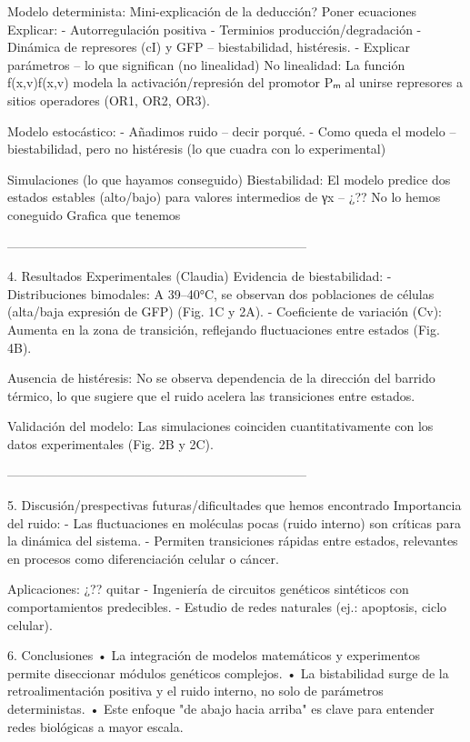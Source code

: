 Modelo determinista:
Mini-explicación de la deducción?
Poner ecuaciones
Explicar:
-	Autorregulación positiva
-	Terminios producción/degradación
-	Dinámica de represores (cI) y GFP – biestabilidad, histéresis.
-	Explicar parámetros – lo que significan (no linealidad)
No linealidad: La función f(x,v)f(x,v) modela la activación/represión del promotor Pₘ al unirse represores a sitios operadores (OR1, OR2, OR3).

Modelo estocástico:
-	Añadimos ruido – decir porqué. 
-	Como queda el modelo – biestabilidad, pero no histéresis (lo que cuadra con lo experimental)

Simulaciones (lo que hayamos conseguido)
Biestabilidad: El modelo predice dos estados estables (alto/bajo) para valores intermedios de γx – ¿?? No lo hemos coneguido
Grafica que tenemos

-----------------------------------------------------------------------

4. Resultados Experimentales (Claudia)
Evidencia de biestabilidad:
- Distribuciones bimodales: A 39–40°C, se observan dos poblaciones de células (alta/baja expresión de GFP) (Fig. 1C y 2A).
- Coeficiente de variación (Cv): Aumenta en la zona de transición, reflejando fluctuaciones entre estados (Fig. 4B).

Ausencia de histéresis:
No se observa dependencia de la dirección del barrido térmico, lo que sugiere que el ruido acelera las transiciones entre estados.

Validación del modelo:
Las simulaciones coinciden cuantitativamente con los datos experimentales (Fig. 2B y 2C).

-----------------------------------------------------------------------

5. Discusión/prespectivas futuras/dificultades que hemos encontrado
Importancia del ruido:
- Las fluctuaciones en moléculas pocas (ruido interno) son críticas para la dinámica del sistema.
- Permiten transiciones rápidas entre estados, relevantes en procesos como diferenciación celular o cáncer.

Aplicaciones: ¿?? quitar
- Ingeniería de circuitos genéticos sintéticos con comportamientos predecibles.
- Estudio de redes naturales (ej.: apoptosis, ciclo celular).

6. Conclusiones
•	La integración de modelos matemáticos y experimentos permite diseccionar módulos genéticos complejos.
•	La bistabilidad surge de la retroalimentación positiva y el ruido interno, no solo de parámetros deterministas.
•	Este enfoque "de abajo hacia arriba" es clave para entender redes biológicas a mayor escala.




